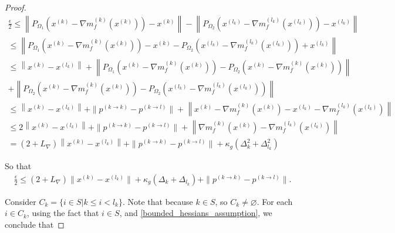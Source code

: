 \documentclass{article}
\theoremstyle{case}
\numberwithin{theorem}{subsection}
\newcommand{\dk}{\Delta_k}
\newcommand{\gk}{{\nabla m_f^{(k)}(x^{(k)})}}
\newcommand{\gradf}{\nabla f}
\newcommand{\lipgrad}{{L_{\nabla}}}
\newcommand{\xk}{{x^{(k)}}}
\begin{document}
\begin{proof}
\begin{align*}
\frac{\epsilon}{2} \le \left \|P_{\Omega_1}\left(\xk - \gk\right) - \xk\right \| - \left\|P_{\Omega_2}\left(x^{(l_k)} - {\nabla m_f^{(l_k)}\left(x^{(l_k)}\right)}\right) - x^{(l_k)}\right\| \\
\le \left\|P_{\Omega_1}\left(\xk - \gk\right) - \xk - P_{\Omega_2}\left(x^{(l_k)} - {\nabla m_f^{(l_k)}\left(x^{(l_k)}\right)}\right) + x^{(l_k)}\right\| \\
\le\left\|\xk - x^{(l_k)}\right\| +  \left\|P_{\Omega_1}\left(\xk - \gk\right) - P_{\Omega_2}\left(\xk - \gk\right)\right\| \\+ \left\|P_{\Omega_2}\left(\xk - \gk\right) - P_{\Omega_2}\left(x^{(l_k)} - {\nabla m_f^{(l_k)}\left(x^{(l_k)}\right)}\right)\right\| \\
\le\left\|\xk - x^{(l_k)}\right\| + \| p^{(k\to k)} - p^{(k\to l)}\| + \left\|\xk - \gk - x^{(l_k)} - {\nabla m_f^{(l_k)}\left(x^{(l_k)}\right)}\right\| \\
\le 2\left\|\xk - x^{(l_k)}\right\| + \| p^{(k\to k)} - p^{(k\to l)}\| + \left\|\gk - {\nabla m_f^{(l_k)}\left(x^{(l_k)}\right)}\right\|\\
=   (2 + \lipgrad) \left\|\xk - x^{(l_k)}\right\| + \| p^{(k\to k)} - p^{(k\to l)}\| + \kappa_g \left(\dk^2 + \Delta_{l_k}^2\right)
\end{align*}



So that
\begin{align}
\frac{\epsilon} 2 \le \left(2 + \lipgrad\right) \|\xk - x^{(l_k)}\| + \kappa_{g}\left(\dk + \Delta_{l_k}\right) + \| p^{(k\to k)} - p^{(k\to l)}\| \label{chi2zero2_conv}.
\end{align}

Consider $C_k = \{i \in S | k \le i < l_k\}$.
Note that because $k \in S$, so $C_k \ne \varnothing $.
For each $i \in C_k$, using the fact that $i \in S$, and \cref{bounded_hessians_assumption}, we conclude that 


\end{proof}
\end{document}
